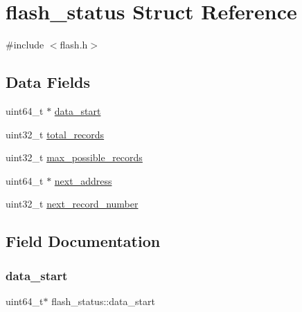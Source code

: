 \hypertarget{structflash__status}{}\section{flash\+\_\+status Struct Reference}
\label{structflash__status}


{\ttfamily \#include $<$flash.\+h$>$}

\subsection*{Data Fields}
\begin{DoxyCompactItemize}
\item 
uint64\+\_\+t $\ast$ \hyperlink{structflash__status_aa4bf893872672c8edf11ee9788ec25db}{data\+\_\+start}
\item 
uint32\+\_\+t \hyperlink{structflash__status_a3ee3c039c0feaf42bf3eb93afd7deab7}{total\+\_\+records}
\item 
uint32\+\_\+t \hyperlink{structflash__status_ac65b214f290d12551fb5c9e529e48341}{max\+\_\+possible\+\_\+records}
\item 
uint64\+\_\+t $\ast$ \hyperlink{structflash__status_ab6d1e9a685e04d71e44dad1e45c9d451}{next\+\_\+address}
\item 
uint32\+\_\+t \hyperlink{structflash__status_a8f400047469cf09aa1ace21c0777643b}{next\+\_\+record\+\_\+number}
\end{DoxyCompactItemize}


\subsection{Field Documentation}
\mbox{\label{structflash__status_aa4bf893872672c8edf11ee9788ec25db}} 
\subsubsection{\texorpdfstring{data\+\_\+start}{data\_start}}
{\footnotesize\ttfamily uint64\+\_\+t$\ast$ flash\+\_\+status\+::data\+\_\+start}

\mbox{\label{structflash__status_ac65b214f290d12551fb5c9e529e48341}} 
